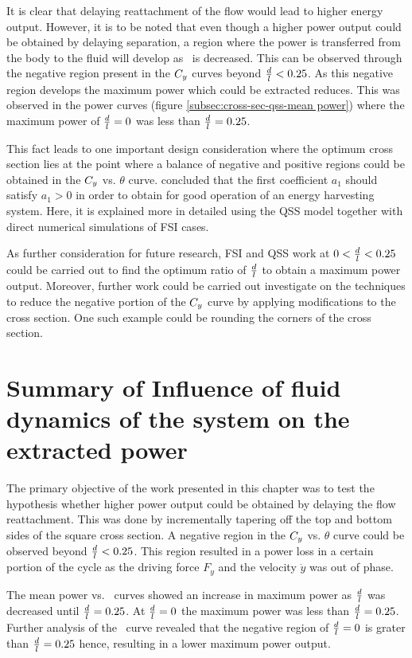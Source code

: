 It is clear that delaying reattachment of the flow would lead to higher energy output. However, it is to be noted that even though a higher power output could be obtained by delaying separation, a region where the power is transferred from the body to the fluid will develop as \ratio\ is decreased. This can be observed through the negative region present in the $C_{y}$ curves beyond $\frac{d}{l}<0.25$. As this negative region develops the maximum power which could be extracted reduces. This was observed in the power curves (figure \ref{subsec:cross-sec-qss-mean power}) where the maximum power of $\frac{d}{l}=0$ was less than $\frac{d}{l}=0.25$.

This fact leads to one important design consideration where the optimum cross section lies at the point where a balance of negative and positive regions could be obtained in the $C_{y}$ vs. $\theta$ curve. \citet{Barrero-Gil2010a} concluded that the first coefficient $a_1$ should satisfy  $a_1>0$ in order to obtain for good operation of an energy harvesting system. Here, it is explained more in detailed using the QSS model together with direct numerical simulations of FSI cases. 

As further consideration for future research, FSI and QSS work at $0<\frac{d}{l}<0.25$ could be carried out to find the optimum ratio of $\frac{d}{l}$ to obtain a maximum power output. Moreover, further work could be carried out investigate on the techniques to reduce the negative portion of the $C_{y}$ curve by applying modifications to the cross section. One such example could be rounding the corners of the cross section.

\section{Summary of Influence of fluid dynamics of the system on the extracted power} 
\label{sec:summary-diff-cross-sec}

The primary objective of the work presented in this chapter was to test the hypothesis whether higher power output could be obtained by delaying the flow reattachment. This was done by incrementally tapering off the top and bottom sides of the square cross section. A negative region in the $C_{y}$ vs. $\theta$ curve could be observed beyond $\frac{d}{l}<0.25$. This region resulted in a power loss in a certain portion of the cycle as the driving force $F_y$ and the velocity $\dot{y}$ was out of phase.

The mean power vs. \massdamp\ curves showed an increase in maximum power as $\frac{d}{l}$ was decreased until $\frac{d}{l}=0.25$. At $\frac{d}{l}=0$ the maximum power was less than $\frac{d}{l}=0.25$. Further analysis of the \cy\ curve revealed that the negative region of $\frac{d}{l}=0$ is grater than $\frac{d}{l}=0.25$ hence, resulting in a lower maximum power output. 

